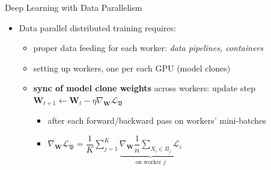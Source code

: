 \begin{frame}{Deep Learning with Data Parallelism}
\protect\hypertarget{deep-learning-with-data-parallelism-12}{}

\begin{itemize}
\tightlist
\item
  Data parallel distributed training requires:

  \begin{itemize}
  \tightlist
  \item
    proper data feeding for each worker: \emph{data pipelines,
    containers}
  \item
    setting up workers, one per each GPU (model clones)
  \item
    \textbf{sync of model clone weights} across workers: update step
    \(\mathbf{W}_{t+1} \leftarrow \mathbf{W}_t - \eta \nabla_\mathbf{W} \mathcal{L}_{\mathfrak{B}}\)

    \begin{itemize}
    \tightlist
    \item
      after each forward/backward pass on workers' mini-batches
    \item
      \(\nabla_\mathbf{W} \mathcal{L}_{\mathfrak{B}} = \dfrac{1}{K} {\displaystyle \sum_{j = 1}^{K} } \underbrace{\nabla_\mathbf{W} \dfrac{1}{n} {\displaystyle \sum_{X_i \in B_j} \mathcal{L}_i}}_{\text{on worker } j}\)
    \end{itemize}
  \end{itemize}
\end{itemize}

\vspace*{-1.5cm}

\end{frame}

